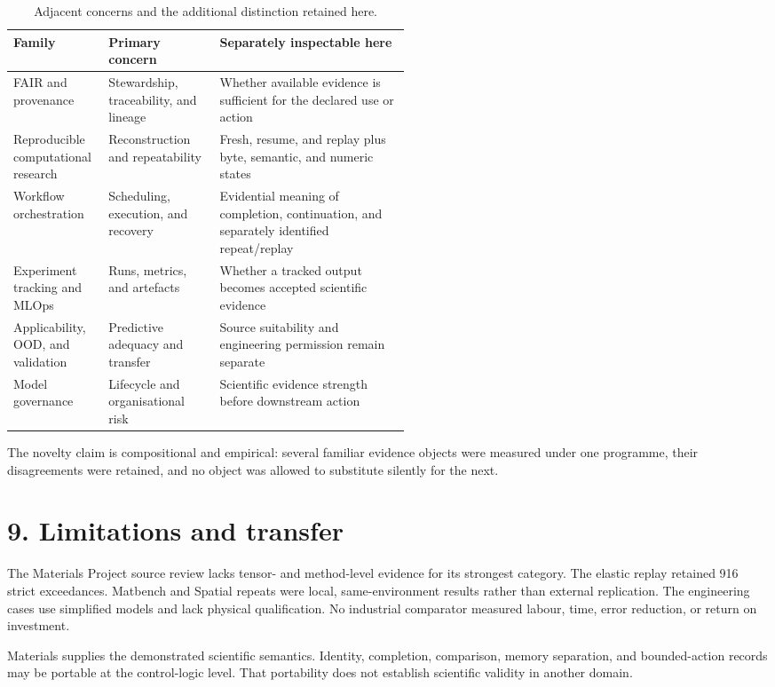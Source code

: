 \documentclass[10pt,a4paper]{article}
\begin{document}
\begin{table}[htbp]\centering\scriptsize
\caption{Adjacent concerns and the additional distinction retained here.}
\begin{tabularx}{\linewidth}{@{}p{0.24\linewidth}p{0.28\linewidth}X@{}}\toprule
Family & Primary concern & Separately inspectable here\\\midrule
FAIR and provenance & Stewardship, traceability, and lineage & Whether available evidence is sufficient for the declared use or action\\
Reproducible computational research & Reconstruction and repeatability & Fresh, resume, and replay plus byte, semantic, and numeric states\\
Workflow orchestration & Scheduling, execution, and recovery & Evidential meaning of completion, continuation, and separately identified repeat/replay\\
Experiment tracking and MLOps & Runs, metrics, and artefacts & Whether a tracked output becomes accepted scientific evidence\\
Applicability, OOD, and validation & Predictive adequacy and transfer & Source suitability and engineering permission remain separate\\
Model governance & Lifecycle and organisational risk & Scientific evidence strength before downstream action\\\bottomrule
\end{tabularx}\end{table}

The novelty claim is compositional and empirical: several familiar evidence objects were measured under one programme, their disagreements were retained, and no object was allowed to substitute silently for the next.

\section{9. Limitations and transfer}
The Materials Project source review lacks tensor- and method-level evidence for its strongest category. The elastic replay retained 916 strict exceedances. Matbench and Spatial repeats were local, same-environment results rather than external replication. The engineering cases use simplified models and lack physical qualification. No industrial comparator measured labour, time, error reduction, or return on investment.

Materials supplies the demonstrated scientific semantics. Identity, completion, comparison, memory separation, and bounded-action records may be portable at the control-logic level. That portability does not establish scientific validity in another domain.
\end{document}
